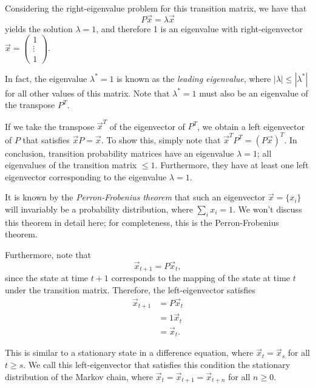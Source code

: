 \documentclass[a4paper, 12pt,oneside,openany]{book}
\begin{document}
Considering the right-eigenvalue problem for this transition matrix, we have that $$P \vec{x} = \lambda \vec{x}$$ yields the solution $\lambda=1$, and therefore 1 is an eigenvalue with right-eigenvector $\vec{x}= \begin{pmatrix} 1\\ \vdots \\ 1 \end{pmatrix}$.

In fact, the eigenvalue $\lambda^*=1$ is known as the \emph{leading eigenvalue}, where $|\lambda| \leq |\lambda^*|$ for all other values of this matrix. Note that $\lambda^*=1$ must also be an eigenvalue of the transpose $P^T$. 

If we take the transpose $\vec{x}^T$ of the eigenvector of $P^T$, we obtain a left eigenvector of $P$ that satisfies $\vec{x} P=\vec{x}$. To show this, simply note that $\vec{x}^T P^T = (P\vec{x})^T$. In conclusion, transition probability matrices have an eigenvalue $\lambda=1$; all eigenvalues of the transition matrix $\leq1.$ Furthermore, they have at least one left eigenvector corresponding to the eigenvalue $\lambda=1$.

It is known by the \emph{Perron-Frobenius theorem} that such an eigenvector $\vec{x} = \{x_i \}$ will invariably be a probability distribution, where $\sum_i x_i = 1.$ We won't discuss this theorem in detail here; for completeness, this is the Perron-Frobenius theorem. 


Furthermore, note that $$\vec{x}_{t+1} = P \vec{x}_t,$$ since the state at time $t+1$ corresponds to the mapping of the state at time $t$ under the transition matrix. Therefore, the left-eigenvector satisfies \begin{align*} \vec{x}_{t+1} &= P \vec{x}_t \\ &= 1\vec{x}_t \\ &= \vec{x}_t .\end{align*}

This is similar to a stationary state in a difference equation, where $\vec{x}_t = \vec{x}_s$ for all $t\geq s$. We call this left-eigenvector that satisfies this condition the stationary distribution of the Markov chain, where $\vec{x}_t = \vec{x}_{t+1} = \vec{x}_{t+n}$ for all $n\geq0$. 
\end{document}
